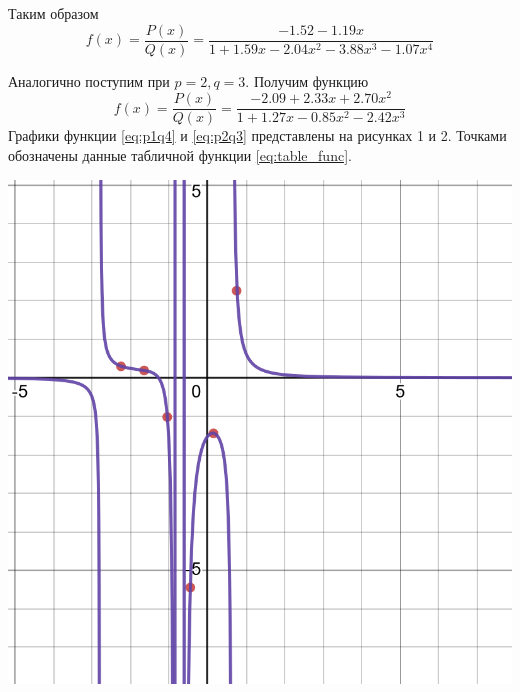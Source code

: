 \documentclass[a4paper, fontsize=14pt]{article}
\begin{document}
Таким образом
\begin{equation}
    \label{eq:p1q4}
    f(x) = \frac{P(x)}{Q(x)} = \frac{-1.52 -1.19x}{1 + 1.59x -2.04x^2 -3.88x^3 -1.07x^4}
\end{equation}

Аналогично поступим при $p = 2, q = 3$. Получим функцию
\begin{equation}
    \label{eq:p2q3}
    f(x) = \frac{P(x)}{Q(x)} = \frac{-2.09 +  2.33x + 2.70x^2}{1 +  1.27x -0.85x^2 -2.42x^3}
\end{equation}
Графики функции \eqref{eq:p1q4} и \eqref{eq:p2q3} представлены на рисунках 1 и 2. Точками обозначены данные табличной функции \eqref{eq:table_func}.

\begin{center}
    \label{p1q4}
    \includegraphics[scale=0.3]{src/p1q4}
\end{center}
\end{document}
